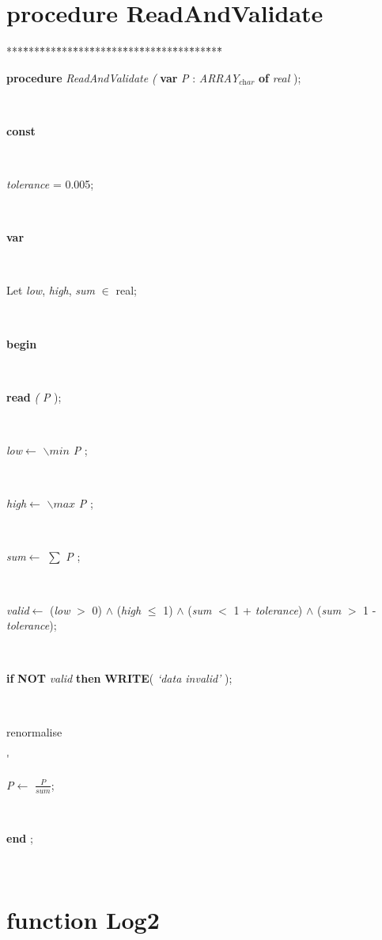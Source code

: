 \documentclass[10pt, a4paper]{article}
\begin{document}
\section{procedure ReadAndValidate}\label{sec:./shannontmtReadAndValidate}

\begin{tabbing}
***\=***\=***\=***\=***\=***\=***\=***\=***\=***\=***\=***\=***\=\kill
\parbox{14cm}{\textsf {\textbf {procedure } \textsf{ \textit{ReadAndValidate} \textit{(} } \textbf{ var } \textsf{\textit{P} : \textit{ARRAY}$_{\textit{char}}$} \textbf{ of } \textsf{ \textit{real} );}}}\\
\+\parbox{14cm}{\textsf{\textbf{const} }}\\
\parbox{14cm}{\textsf{\textit{tolerance}  = 0.005;}}\\
\<\parbox{14cm}{\textsf{\textbf{var} }}\\
\parbox{14cm}{\textsf{Let \textit{low}, \textit{high}, \textit{sum} $\in$ real;}}\\
\-\<\+\parbox{14cm}{\textsf{\textbf{begin} }}\\
\parbox{14cm}{\textsf{\textbf{read} \textit{(} \textit{P} );}}\\
\parbox{14cm}{\textsf{\textit{low}$\leftarrow$ \textbf{ $\backslash min $ } \textit{P} }; }\\
\parbox{14cm}{\textsf{\textit{high}$\leftarrow$ \textbf{ $\backslash max$ } \textit{P} }; }\\
\parbox{14cm}{\textsf{\textit{sum}$\leftarrow$  $\sum$  \textit{P} }; }\\
\parbox{14cm}{\textsf{\textit{valid}$\leftarrow$ (\textit{low} $>$ 0) $\wedge$ (\textit{high} $\leq$ 1) $\wedge$ (\textit{sum} $<$ 1 + \textit{tolerance}) $\wedge$ (\textit{sum} $>$ 1 - \textit{tolerance})}; }\\
\parbox{14cm}{\textsf {\textbf {if } \textsf{\textbf{NOT} \textit{valid} } \textbf{ then } \textsf{\textbf{WRITE}(\textit{\textrm{\textup { `data invalid' } }})}; }}\\
\<\parbox{3.5cm}{\scriptsize{renormalise}}\'\>\parbox{14cm}{\textsf{\textit{P}$\leftarrow$ $\frac{\textit{P}}{\textit{sum}}$}; }\\
\<\-\parbox{14cm}{\textsf{\textbf{end}   ;}}\\
\end{tabbing}
\section{function Log2}\label{sec:./shannontmt/HLog2}
\end{document}
